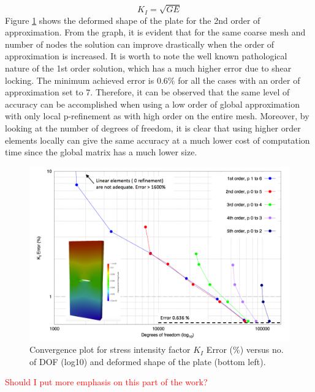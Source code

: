 \documentclass[11pt]{acmeArticle}
\numberwithin{equation}{section}
\begin{document}
\begin{equation}
K_I = \sqrt{GE}
\end{equation}
Figure \ref{fig:plate_conv_no_sing} shows the deformed shape of the plate for the 2nd order of approximation. From the graph, it is evident that for the same coarse mesh and number of nodes the solution can improve drastically when the order of approximation is increased. It is worth to note the well known pathological nature of the 1st order solution, which has a much higher error due to shear locking. The minimum achieved error is $0.6\%$ for all the cases with an order of approximation set to 7. Therefore, it can be observed that the same level of accuracy can be accomplished when using a low order of global approximation with only local p-refinement as with high order on the entire mesh. Moreover, by looking at the number of degrees of freedom, it is clear that using higher order elements locally can give the same accuracy at a much lower cost of computation time since the global matrix has a much lower size.
\begin{figure}
	\centering
	\includegraphics[width=0.7\linewidth]{Figures/graphs/plate_conv_no_sing.png}
	\caption{Convergence plot for stress intensity factor $K_I$ Error (\%) versus no. of DOF (log10) and deformed shape of the plate (bottom left).}
	\label{fig:plate_conv_no_sing}
\end{figure}
\textcolor{red}{Should I put more emphasis on this part of the work?}
\end{document}

